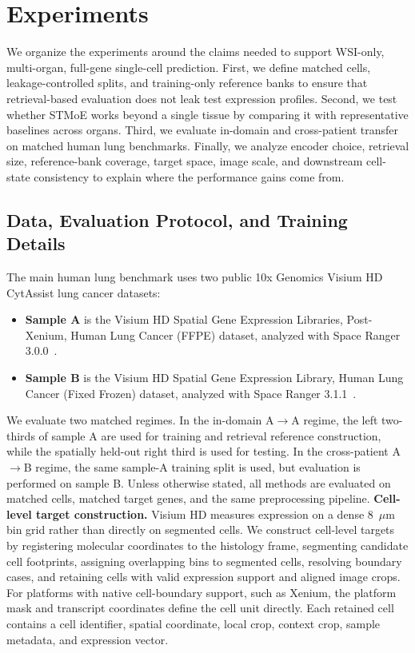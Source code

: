\documentclass[sigconf]{acmart}
\newcommand{\method}{STMoE\xspace}
\begin{document}
\section{Experiments}

We organize the experiments around the claims needed to support WSI-only, multi-organ, full-gene single-cell prediction. First, we define matched cells, leakage-controlled splits, and training-only reference banks to ensure that retrieval-based evaluation does not leak test expression profiles. Second, we test whether \method{} works beyond a single tissue by comparing it with representative baselines across organs. Third, we evaluate in-domain and cross-patient transfer on matched human lung benchmarks. Finally, we analyze encoder choice, retrieval size, reference-bank coverage, target space, image scale, and downstream cell-state consistency to explain where the performance gains come from.


\subsection{Data, Evaluation Protocol, and Training Details}

The main human lung benchmark uses two public 10x Genomics Visium HD CytAssist lung cancer datasets:
\begin{itemize}[leftmargin=*]
    \item \textbf{Sample A} is the Visium HD Spatial Gene Expression Libraries, Post-Xenium, Human Lung Cancer (FFPE) dataset, analyzed with Space Ranger 3.0.0~\cite{tenx2024visiumhd_lung_postxenium}.
    \item \textbf{Sample B} is the Visium HD Spatial Gene Expression Library, Human Lung Cancer (Fixed Frozen) dataset, analyzed with Space Ranger 3.1.1~\cite{tenx2024visiumhd_lung_fixedfrozen}.
\end{itemize}
We evaluate two matched regimes. In the in-domain A$\rightarrow$A regime, the left two-thirds of sample A are used for training and retrieval reference construction, while the spatially held-out right third is used for testing. In the cross-patient A$\rightarrow$B regime, the same sample-A training split is used, but evaluation is performed on sample B. Unless otherwise stated, all methods are evaluated on matched cells, matched target genes, and the same preprocessing pipeline.
\textbf{Cell-level target construction.}
Visium HD measures expression on a dense 8~$\mu$m bin grid rather than directly on segmented cells. We construct cell-level targets by registering molecular coordinates to the histology frame, segmenting candidate cell footprints, assigning overlapping bins to segmented cells, resolving boundary cases, and retaining cells with valid expression support and aligned image crops. For platforms with native cell-boundary support, such as Xenium, the platform mask and transcript coordinates define the cell unit directly. Each retained cell contains a cell identifier, spatial coordinate, local crop, context crop, sample metadata, and expression vector.
\end{document}
